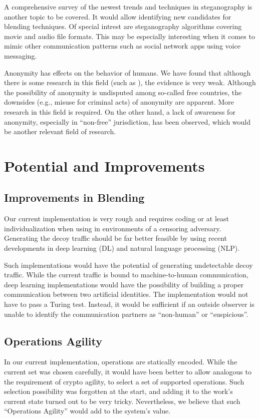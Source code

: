 A comprehensive survey of the newest trends and techniques in steganography is another topic to be covered. It would allow identifying new candidates for blending techniques. Of special intrest are steganography algorithms covering movie and audio file formats. This may be especially interesting when it comes to mimic other communication patterns such as social network apps using voice messaging.

Anonymity has effects on the behavior of humans. We have found that although there is some research in this field (such as \cite{postmes2001social}), the evidence is very weak. Although the possibility of anonymity is undisputed among so-called free countries, the downsides (e.g., misuse for criminal acts) of anonymity are apparent. More research in this field is required. On the other hand, a lack of awareness for anonymity, especially in ``non-free'' jurisdiction, has been observed, which would be another relevant field of research. 

\chapter{Potential and Improvements}
\section{Improvements in Blending}
Our current implementation is very rough and requires coding or at least individualization when using in environments of a censoring adversary. Generating the decoy traffic should be far better feasible by using recent developments in deep learning (DL) and natural language processing (NLP). 

Such implementations would have the potential of generating undetectable decoy traffic. While the current traffic is bound to machine-to-human communication, deep learning implementations would have the possibility of building a proper communication between two artificial identities. The implementation would not have to pass a Turing test. Instead, it would be sufficient if an outside observer is unable to identify the communication partners as ``non-human'' or ``suspicious''.

\section{Operations Agility}
In our current implementation, operations are statically encoded. While the current set was chosen carefully, it would have been better to allow analogous to the requirement of crypto agility, to select a set of supported operations. Such selection possibility was forgotten at the start, and adding it to the work's current state turned out to be very tricky. Nevertheless, we believe that such ``Operations Agility'' would add to the system's value.

